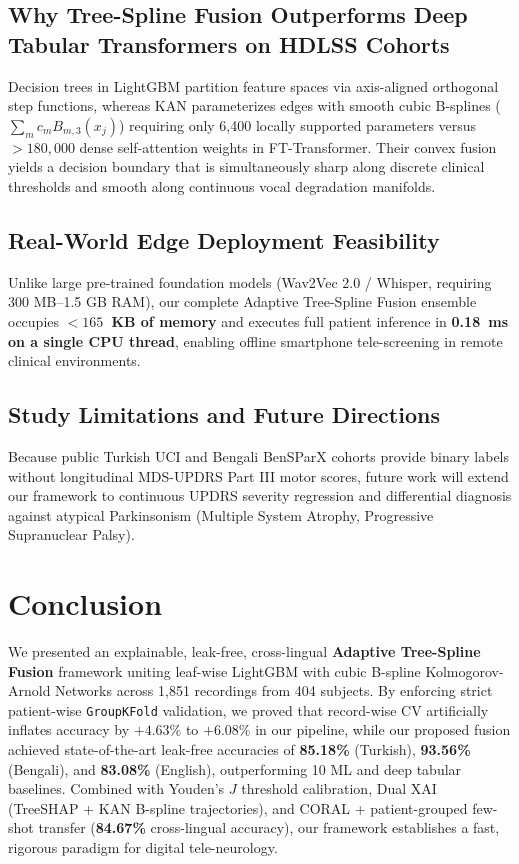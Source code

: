 \documentclass[journal,10pt,twoside]{IEEEtran}
\begin{document}
\subsection{Why Tree-Spline Fusion Outperforms Deep Tabular Transformers on HDLSS Cohorts}
Decision trees in LightGBM partition feature spaces via axis-aligned orthogonal step functions, whereas KAN parameterizes edges with smooth cubic B-splines ($\sum_m c_m B_{m,3}(x_j)$) requiring only 6,400 locally supported parameters versus $>180,000$ dense self-attention weights in FT-Transformer. Their convex fusion yields a decision boundary that is simultaneously sharp along discrete clinical thresholds and smooth along continuous vocal degradation manifolds.

\subsection{Real-World Edge Deployment Feasibility}
Unlike large pre-trained foundation models (Wav2Vec 2.0 / Whisper, requiring 300 MB--1.5 GB RAM), our complete Adaptive Tree-Spline Fusion ensemble occupies \textbf{$<165$~KB of memory} and executes full patient inference in \textbf{0.18~ms on a single CPU thread}, enabling offline smartphone tele-screening in remote clinical environments.

\subsection{Study Limitations and Future Directions}
Because public Turkish UCI and Bengali BenSParX cohorts provide binary labels without longitudinal MDS-UPDRS Part III motor scores, future work will extend our framework to continuous UPDRS severity regression and differential diagnosis against atypical Parkinsonism (Multiple System Atrophy, Progressive Supranuclear Palsy).

\section{Conclusion}
We presented an explainable, leak-free, cross-lingual \textbf{Adaptive Tree-Spline Fusion} framework uniting leaf-wise LightGBM with cubic B-spline Kolmogorov-Arnold Networks across 1,851 recordings from 404 subjects. By enforcing strict patient-wise \texttt{GroupKFold} validation, we proved that record-wise CV artificially inflates accuracy by $+4.63\%$ to $+6.08\%$ in our pipeline, while our proposed fusion achieved state-of-the-art leak-free accuracies of \textbf{85.18\%} (Turkish), \textbf{93.56\%} (Bengali), and \textbf{83.08\%} (English), outperforming 10 ML and deep tabular baselines. Combined with Youden's $J$ threshold calibration, Dual XAI (TreeSHAP + KAN B-spline trajectories), and CORAL + patient-grouped few-shot transfer (\textbf{84.67\%} cross-lingual accuracy), our framework establishes a fast, rigorous paradigm for digital tele-neurology.
\end{document}
